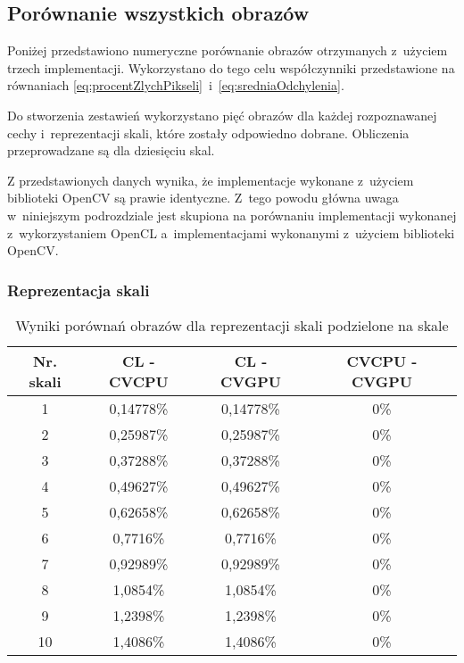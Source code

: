 \subsection{Porównanie wszystkich obrazów}
\label{subsec:porownanieNumerycznePoprawnosc}

Poniżej przedstawiono numeryczne porównanie obrazów otrzymanych z~użyciem trzech implementacji. Wykorzystano do tego celu współczynniki przedstawione na równaniach \ref{eq:procentZlychPikseli}~i~\ref{eq:sredniaOdchylenia}.

Do stworzenia zestawień wykorzystano pięć obrazów dla każdej rozpoznawanej cechy i~reprezentacji skali, które zostały odpowiedno dobrane. Obliczenia przeprowadzane są dla dziesięciu skal.

Z przedstawionych danych wynika, że implementacje wykonane z~użyciem biblioteki OpenCV są prawie identyczne. Z~tego powodu główna uwaga w~niniejszym podrozdziale jest skupiona na porównaniu implementacji wykonanej z~wykorzystaniem OpenCL a~implementacjami wykonanymi z~użyciem biblioteki OpenCV.
\subsubsection{Reprezentacja skali}
\label{subsubsec:reprezentacjaSakliTabele}

\begin{center}
\begin{table}
\centering
\caption{Wyniki porównań obrazów dla reprezentacji skali podzielone na skale}
\label{tab:imageScaleRep}
\begin{tabular}{|c|c|c|c|}
 \hline
Nr. skali & CL - CVCPU & CL - CVGPU & CVCPU - CVGPU \\ \hline
1 & 0,14778\% & 0,14778\% & 0\% \\ \hline
2 & 0,25987\% & 0,25987\% & 0\% \\ \hline
3 & 0,37288\% & 0,37288\% & 0\% \\ \hline
4 & 0,49627\% & 0,49627\% & 0\% \\ \hline
5 & 0,62658\% & 0,62658\% & 0\% \\ \hline
6 & 0,7716\% & 0,7716\% & 0\% \\ \hline
7 & 0,92989\% & 0,92989\% & 0\% \\ \hline
8 & 1,0854\% & 1,0854\% & 0\% \\ \hline
9 & 1,2398\% & 1,2398\% & 0\% \\ \hline
10 & 1,4086\% & 1,4086\% & 0\% \\ \hline
\end{tabular}
\end{table}
\end{center}

